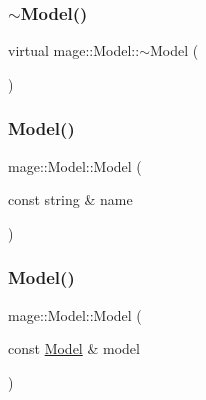 \subsubsection{\texorpdfstring{$\sim$\+Model()}{~Model()}}
{\footnotesize\ttfamily virtual mage\+::\+Model\+::$\sim$\+Model (\begin{DoxyParamCaption}{ }\end{DoxyParamCaption})\hspace{0.3cm}{\ttfamily [virtual]}}

\hypertarget{classmage_1_1_model_adc37cc2030a93cde5da20f9a941c060e}{}\label{classmage_1_1_model_adc37cc2030a93cde5da20f9a941c060e} 
\subsubsection{\texorpdfstring{Model()}{Model()}\hspace{0.1cm}{\footnotesize\ttfamily [1/3]}}
{\footnotesize\ttfamily mage\+::\+Model\+::\+Model (\begin{DoxyParamCaption}\item[{const string \&}]{name }\end{DoxyParamCaption})\hspace{0.3cm}{\ttfamily [protected]}}

\hypertarget{classmage_1_1_model_ac5f1d340bbfefd30bec3e6343a86059a}{}\label{classmage_1_1_model_ac5f1d340bbfefd30bec3e6343a86059a} 
\subsubsection{\texorpdfstring{Model()}{Model()}\hspace{0.1cm}{\footnotesize\ttfamily [2/3]}}
{\footnotesize\ttfamily mage\+::\+Model\+::\+Model (\begin{DoxyParamCaption}\item[{const \hyperlink{classmage_1_1_model}{Model} \&}]{model }\end{DoxyParamCaption})\hspace{0.3cm}{\ttfamily [protected]}}

\hypertarget{classmage_1_1_model_a71abc57cde3bd6270de88bfa3aa47601}{}\label{classmage_1_1_model_a71abc57cde3bd6270de88bfa3aa47601} 
